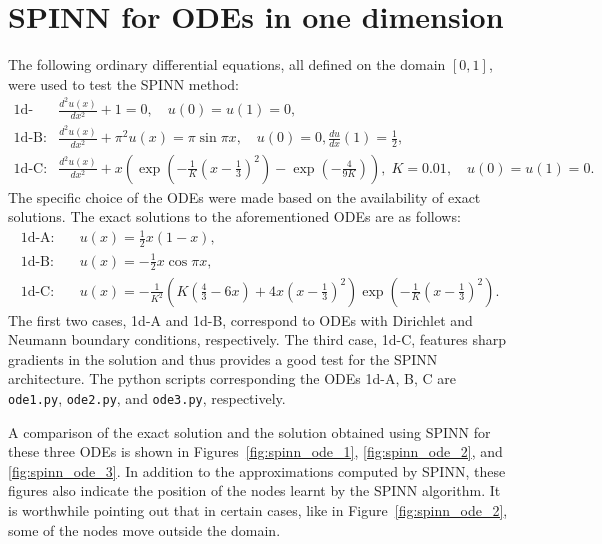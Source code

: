 \documentclass[12pt]{article}
\newcommand{\code}[1]{\lstinline{#1}}
\begin{document}
\section{SPINN for ODEs in one dimension} \label{app:ode}
The following ordinary differential equations, all defined on the domain $[0,1]$, were used to test the SPINN method:
\begin{displaymath}
\begin{split}
\text{1d-A:}\quad & \frac{d^2 u(x)}{dx^2} + 1 = 0, \quad u(0) = u(1) = 0,\\
\text{1d-B:}\quad & \frac{d^2 u(x)}{dx^2} + \pi^2 u(x) = \pi \sin \pi x, \quad u(0) = 0, \frac{du}{dx}(1) = \frac{1}{2},\\
\text{1d-C:}\quad & \frac{d^2 u(x)}{dx^2} + x\left(\exp {\left(-\frac{1}{K}\left(x - \frac{1}{3}\right)^2\right)} - \exp {\left(-\frac{4}{9K}\right)}\right), \; K = 0.01, \quad u(0) = u(1) = 0.
\end{split}
\end{displaymath}
The specific choice of the ODEs were made based on the availability of exact solutions.  The exact solutions to the aforementioned ODEs are as follows:
\begin{displaymath}
\begin{split}
\text{1d-A:}\quad& u(x) = \frac{1}{2}x(1 - x),\\
\text{1d-B:}\quad& u(x) = -\frac{1}{2}x\cos \pi x,\\
\text{1d-C:}\quad& u(x) = -\frac{1}{K^2}\left(K \left(\frac{4}{3} - 6x\right) + 4x\left(x - \frac{1}{3}\right)^2\right)\exp\left(-\frac{1}{K}\left(x - \frac{1}{3}\right)^2\right).
\end{split}
\end{displaymath}
The first two cases, 1d-A and 1d-B, correspond to ODEs with Dirichlet and Neumann boundary conditions, respectively. The third case, 1d-C, features sharp gradients in the solution and thus provides a good test for the SPINN architecture. The python scripts corresponding the ODEs 1d-A, B, C are \code{ode1.py}, \code{ode2.py}, and \code{ode3.py}, respectively.

A comparison of the exact solution and the solution obtained using SPINN for these three ODEs is shown in Figures~\ref{fig:spinn_ode_1}, \ref{fig:spinn_ode_2}, and \ref{fig:spinn_ode_3}. In addition to the approximations computed by SPINN, these figures also indicate the position of the nodes learnt by the SPINN algorithm. It is worthwhile pointing out that in certain cases, like in Figure~\ref{fig:spinn_ode_2}, some of the nodes move outside the domain.
\end{document}
